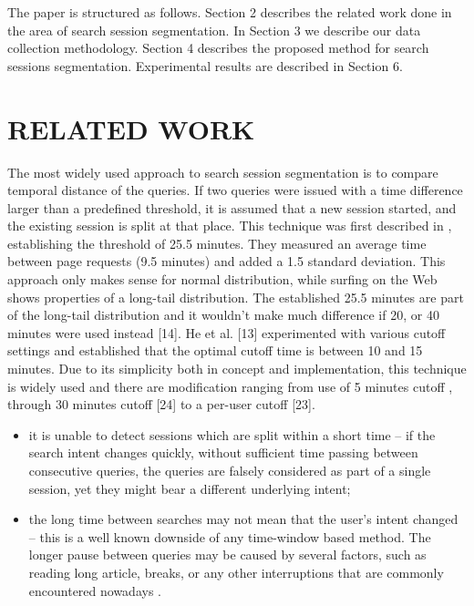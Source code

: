 \documentclass{acm_proc_article-sp} %
\begin{document}
The paper is structured as follows. Section 2 describes the
related work done in the area of search session segmentation.
In Section 3 we describe our data collection methodology.
Section 4 describes the proposed method for search
sessions segmentation. Experimental results are described
in Section 6.

\section{RELATED WORK}

The most widely used approach to search session segmentation
is to compare temporal distance of the queries. If two
queries were issued with a time difference larger than a predefined
threshold, it is assumed that a new session started,
and the existing session is split at that place. This technique
was first described in \cite{Catledge:1}, establishing the threshold
of 25.5 minutes. They measured an average time between
page requests (9.5 minutes) and added a 1.5 standard deviation.
This approach only makes sense for normal distribution,
while surfing on the Web shows properties of a long-tail
distribution. The established 25.5 minutes are part of the
long-tail distribution and it wouldn’t make much difference
if 20, or 40 minutes were used instead [14]. He et al. [13] experimented
with various cutoff settings and established that
the optimal cutoff time is between 10 and 15 minutes. Due
to its simplicity both in concept and implementation, this
technique is widely used and there are modification ranging
from use of 5 minutes cutoff \cite{Downey:1}, through 30 minutes cutoff
[24] to a per-user cutoff [23].

\begin{itemize}  
	\item it is unable to detect sessions which are split within
	a short time – if the search intent changes quickly,
	without sufficient time passing between consecutive
	queries, the queries are falsely considered as part of
	a single session, yet they might bear a different underlying
	intent;
	\item the long time between searches may not mean that the
	user’s intent changed – this is a well known downside
	of any time-window based method. The longer pause
	between queries may be caused by several factors, such
	as reading long article, breaks, or any other interruptions
	that are commonly encountered nowadays \cite{Coplien:MPD}.
\end{itemize}
\end{document}
